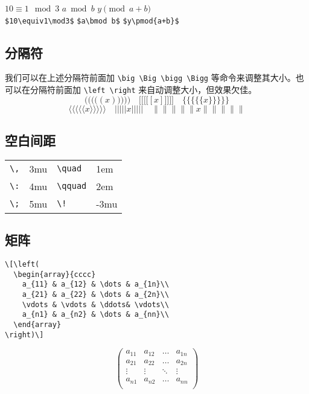 \documentclass[a4paper]{article}
\newcommand\bpics[1]{\par\vspace{1ex}\noindent\begin{minipage}{\textwidth}\begin{minipage}{#1\textwidth}}
\newcommand\mpics[1]{\end{minipage}\begin{minipage}{#1\textwidth}\linespread{1}}
\newcommand\epics{\end{minipage}\end{minipage}\par\vspace{2ex}}
\begin{document}
    $10\equiv1\mod3$   \quad  $a\bmod b$ \quad $y\pmod{a+b}$\\
    \verb|$10\equiv1\mod3$|  \quad \verb|$a\bmod b$| \quad \verb|$y\pmod{a+b}$|


  \subsection{分隔符}
    我们可以在上述分隔符前面加 \verb|\big \Big \bigg \Bigg| 等命令来调整其大小。也可以在分隔符前面加 \verb|\left \right| 来自动调整大小，但效果欠佳。
      \[ \Bigg(\bigg(\Big(\big((x)\big)\Big)\bigg)\Bigg)\quad
         \Bigg[\bigg[\Big[\big[[x]\big]\Big]\bigg]\Bigg]\quad
         \Bigg\{\bigg\{\Big\{\big\{\{x\}\big\}\Big\}\bigg\}\Bigg\}\]
      \[ \Bigg\langle\bigg\langle\Big\langle\big\langle\langle x
         \rangle\big\rangle\Big\rangle\bigg\rangle\Bigg\rangle\quad
         \Bigg\lvert\bigg\lvert\Big\lvert\big\lvert\lvert x
         \rvert\big\rvert\Big\rvert\bigg\rvert\Bigg\rvert\quad
         \Bigg\lVert\bigg\lVert\Big\lVert\big\lVert\lVert x
         \rVert\big\rVert\Big\rVert\bigg\rVert\Bigg\rVert\]
  \subsection{空白间距}
    \begin{tabular}{llll}
      \hline
      \verb+\,+ & 3mu & \verb+\quad+ & 1em \\
      \verb+\:+ & 4mu & \verb+\qquad+ & 2em \\
      \verb+\;+ & 5mu & \verb+\!+ & -3mu \\
      \hline
    \end{tabular}
  \subsection{矩阵}
    \bpics{0.6}\begin{verbatim}
\[\left(
  \begin{array}{cccc}
    a_{11} & a_{12} & \dots & a_{1n}\\
    a_{21} & a_{22} & \dots & a_{2n}\\
    \vdots & \vdots & \ddots& \vdots\\
    a_{n1} & a_{n2} & \dots & a_{nn}\\
  \end{array}
\right)\]\end{verbatim}
    \mpics{0.3}
      \[\left(
        \begin{array}{cccc}
          a_{11} & a_{12} & \dots & a_{1n}\\
          a_{21} & a_{22} & \dots & a_{2n}\\
          \vdots & \vdots & \ddots& \vdots\\
          a_{n1} & a_{n2} & \dots & a_{nn}\\
        \end{array}
      \right)\]
    \epics
\end{document}
